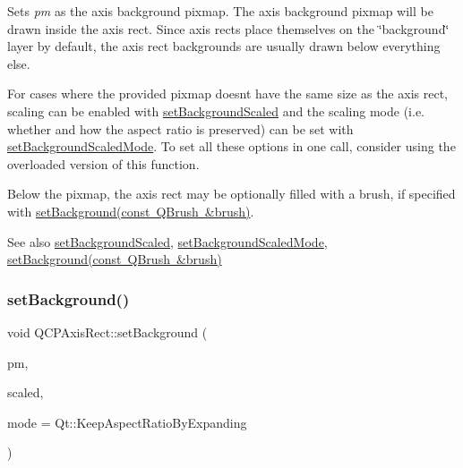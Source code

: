 Sets {\itshape pm} as the axis background pixmap. The axis background pixmap will be drawn inside the axis rect. Since axis rects place themselves on the \char`\"{}background\char`\"{} layer by default, the axis rect backgrounds are usually drawn below everything else.

For cases where the provided pixmap doesn\textquotesingle{}t have the same size as the axis rect, scaling can be enabled with \mbox{\hyperlink{class_q_c_p_axis_rect_ae6d36c3e0e968ffb991170a018e7b503}{set\+Background\+Scaled}} and the scaling mode (i.\+e. whether and how the aspect ratio is preserved) can be set with \mbox{\hyperlink{class_q_c_p_axis_rect_a5ef77ea829c9de7ba248e473f48f7305}{set\+Background\+Scaled\+Mode}}. To set all these options in one call, consider using the overloaded version of this function.

Below the pixmap, the axis rect may be optionally filled with a brush, if specified with \mbox{\hyperlink{class_q_c_p_axis_rect_a22a22b8668735438dc06f9a55fe46b33}{set\+Background(const Q\+Brush \&brush)}}.

\begin{DoxySeeAlso}{See also}
\mbox{\hyperlink{class_q_c_p_axis_rect_ae6d36c3e0e968ffb991170a018e7b503}{set\+Background\+Scaled}}, \mbox{\hyperlink{class_q_c_p_axis_rect_a5ef77ea829c9de7ba248e473f48f7305}{set\+Background\+Scaled\+Mode}}, \mbox{\hyperlink{class_q_c_p_axis_rect_a22a22b8668735438dc06f9a55fe46b33}{set\+Background(const Q\+Brush \&brush)}} 
\end{DoxySeeAlso}
\mbox{\label{class_q_c_p_axis_rect_ac48a2d5d9b7732e73b86605c69c5e4c1}} 
\subsubsection{\texorpdfstring{set\+Background()}{setBackground()}\hspace{0.1cm}{\footnotesize\ttfamily [2/3]}}
{\footnotesize\ttfamily void Q\+C\+P\+Axis\+Rect\+::set\+Background (\begin{DoxyParamCaption}\item[{const Q\+Pixmap \&}]{pm,  }\item[{bool}]{scaled,  }\item[{Qt\+::\+Aspect\+Ratio\+Mode}]{mode = {\ttfamily Qt\+:\+:KeepAspectRatioByExpanding} }\end{DoxyParamCaption})}

